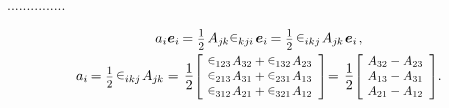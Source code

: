...............

\nopagebreak\vspace{-0.5em}
\begin{equation*}\begin{array}{c}
a_{i} \bm{e}_i \hspace{-0.2ex}
= \smalldisplaystyleonehalf \hspace{.25ex} A_{j\hspace{-0.1ex}k} \permutationsparitysymbols{kj\hspace{-0.06ex}i} \hspace{.2ex} \bm{e}_i \hspace{-0.2ex}
= \smalldisplaystyleonehalf \hspace{.3ex} \permutationsparitysymbols{ikj} \hspace{.1ex} A_{j\hspace{-0.1ex}k} \hspace{.2ex} \bm{e}_i
\hspace{.2ex} ,
\\[.5em]
a_{i} \hspace{-0.2ex} = \smalldisplaystyleonehalf \hspace{.3ex} \permutationsparitysymbols{ikj} \hspace{.1ex} A_{j\hspace{-0.1ex}k} = \hspace{.1em}
\displaystyle \onehalf \scalebox{.9}{$\left[\hspace{-0.25ex} \begin{array}{c}
\permutationsparitysymbols{123} \hspace{.1ex} A_{32} + \permutationsparitysymbols{132} \hspace{.1ex} A_{23} \\
\permutationsparitysymbols{213} \hspace{.1ex} A_{31} + \permutationsparitysymbols{231} \hspace{.1ex} A_{13} \\
\permutationsparitysymbols{312} \hspace{.1ex} A_{21} + \permutationsparitysymbols{321} \hspace{.1ex} A_{12}
\end{array} \right]$} \hspace{-0.2em} = \hspace{.1em}
\displaystyle \onehalf \scalebox{.9}{$\left[\hspace{-0.3ex} \begin{array}{c}
A_{32} - A_{23} \\
A_{13} - A_{31} \\
A_{21} - A_{12}
\end{array} \right]$} .
\vspace{.1em}\end{array}\end{equation*}

